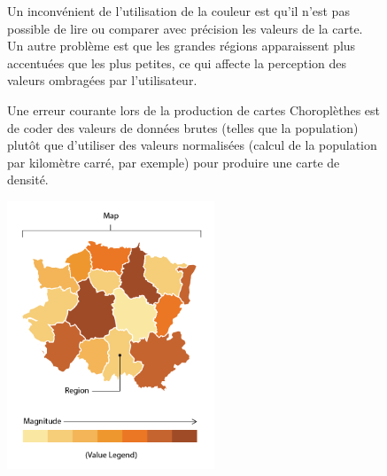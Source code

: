 \documentclass[french, a4paper, 12pt]{report}
\begin{document}
\begin{figure}[!htb]
\begin{minipage}{0.46\linewidth}
Un inconvénient de l'utilisation de la couleur est qu’il n’est pas possible de lire ou comparer avec précision les valeurs de la carte. Un autre problème est que les grandes régions apparaissent plus accentuées que les plus petites, ce qui affecte la perception des valeurs ombragées par l’utilisateur. 

Une erreur courante lors de la production de cartes Choroplèthes est de coder des valeurs de données brutes (telles que la population) plutôt que d'utiliser des valeurs normalisées (calcul de la population par kilomètre carré, par exemple) pour produire une carte de densité.
\end{minipage}\hfil
\begin{minipage}{0.35\linewidth}
    \includegraphics[height=8cm]{images/choropleth-zoom.png}
    \caption{}
 \label{fig:4.6}
\end{minipage}
\end{figure}
\end{document}
